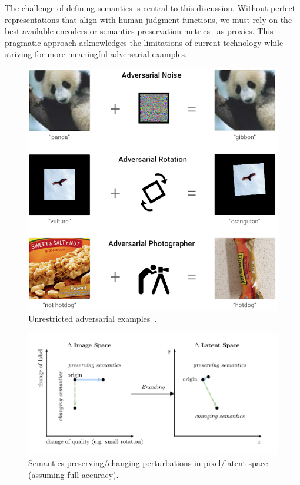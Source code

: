 \documentclass[a4paper, oneside]{discothesis}
\begin{document}
The challenge of defining semantics is central to this discussion. Without perfect representations that align with human judgment functions, we must rely on the best available encoders or semantics preservation metrics~\cite{engstrom2019exploring, herel2023preserving} as proxies. This pragmatic approach acknowledges the limitations of current technology while striving for more meaningful adversarial examples.

\begin{figure}
	\centering
	\includegraphics[width=0.75\columnwidth]{figures/unrestricted-advx.png}
	\caption{Unrestricted adversarial examples~\cite{brown2018unrestricted}.}
	\label{fig:unrestricted}
\end{figure}

\begin{figure}
	\centering
	\includegraphics[width=1\columnwidth]{figures/latentspace.pdf}
	\caption{Semantics preserving/changing perturbations in pixel/latent-space (assuming full accuracy).}
	\label{fig:latentspace}
\end{figure}
\end{document}
